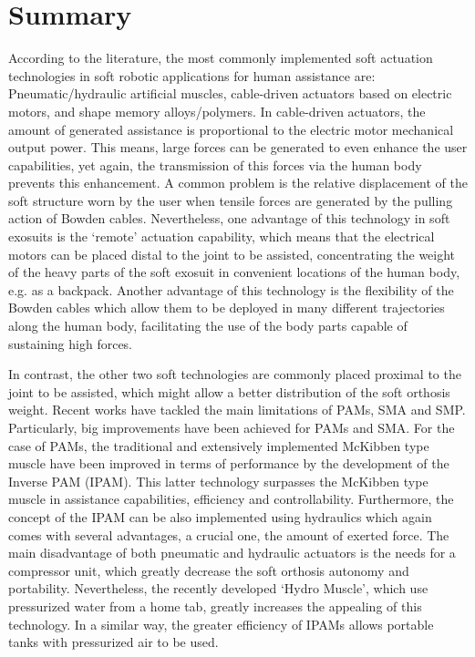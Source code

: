 \section{Summary}

According to the literature, the most commonly implemented soft actuation technologies in soft robotic applications for human assistance are: Pneumatic/hydraulic artificial muscles, cable-driven actuators based on electric motors, and shape memory alloys/polymers.  In cable-driven actuators, the amount of generated assistance is proportional to the electric motor mechanical output power. This means, large forces can be generated to even enhance the user capabilities, yet again, the transmission of this forces via the human body prevents this enhancement. A common problem is the relative displacement of the soft structure worn by the user when tensile forces are generated by the pulling action of Bowden cables. Nevertheless, one advantage of this technology in soft exosuits is the `remote' actuation capability, which means that the electrical motors can be placed distal to the joint to be assisted, concentrating the weight of the heavy parts of the soft exosuit in convenient locations of the human body, e.g. as a backpack. Another advantage of this technology is the flexibility of the Bowden cables which allow them to be deployed in many different trajectories along the human body, facilitating the use of the body parts capable of sustaining high forces.

In contrast, the other two soft technologies are commonly placed proximal to the joint to be assisted, which might allow a better distribution of the soft orthosis weight. Recent works have tackled the main limitations of PAMs, SMA and SMP. Particularly, big improvements have been achieved for PAMs and SMA. For the case of PAMs, the traditional and extensively implemented McKibben type muscle have been improved in terms of performance by the development of the Inverse PAM (IPAM). This latter technology surpasses the McKibben type muscle in assistance capabilities, efficiency and controllability. Furthermore, the concept of the IPAM can be also implemented using hydraulics which again comes with several advantages, a crucial one, the amount of exerted force. The main disadvantage of both pneumatic and hydraulic actuators is the needs for a compressor unit, which greatly decrease the soft orthosis autonomy and portability. Nevertheless, the recently developed `Hydro Muscle', which use pressurized water from a home tab, greatly increases the appealing of this technology. In a similar way, the greater efficiency of IPAMs allows portable tanks with pressurized air to be used.

